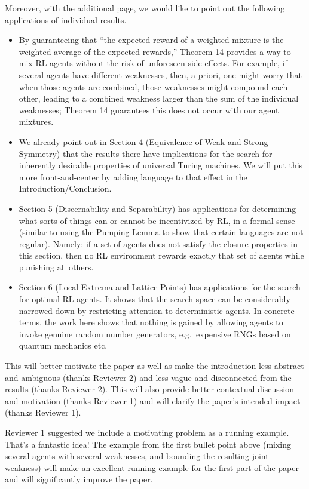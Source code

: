\documentclass{article}
\begin{document}
Moreover, with the additional page, we would like to point out the following applications of individual results.
\begin{itemize}
    \item
    By guaranteeing that ``the expected reward of a weighted mixture is the weighted
    average of the expected rewards,'' Theorem 14 provides a way to mix RL
    agents without the risk of unforeseen side-effects. For example, if several
    agents have different weaknesses,
    then, a priori, one might worry that when those agents are combined, those weaknesses
    might compound each other, leading to a combined weakness larger than the sum of the
    individual weaknesses; Theorem 14
    guarantees this does not occur with our agent mixtures.
    \item
    We already point out in Section 4 (Equivalence of Weak and Strong Symmetry)
    that the results there
    have implications for the search for inherently desirable properties of universal Turing
    machines. We will put this more front-and-center by adding language to that effect in the
    Introduction/Conclusion.
    \item
    Section 5 (Discernability and Separability) has applications for determining what
    sorts of things can or cannot be incentivized by RL, in a formal sense 
    (similar to using the Pumping Lemma to show that certain
    languages are not regular). Namely: if a set of agents does not satisfy the
    closure properties in this
    section, then no RL environment rewards
    exactly that set of agents while punishing all others.
    \item
    Section 6 (Local Extrema and Lattice Points) has applications for the search for
    optimal RL agents. It shows that the search space can be
    considerably narrowed down by restricting attention to deterministic agents. In concrete
    terms, the work here shows that nothing is gained by allowing agents to invoke
    genuine random number generators, e.g.\ expensive RNGs based on quantum mechanics etc.
\end{itemize}
This will better motivate the paper as well as make the introduction less abstract and ambiguous (thanks Reviewer 2) and less vague and disconnected from the results (thanks Reviewer 2). This will also provide better contextual discussion and motivation (thanks Reviewer 1) and will clarify the paper's intended impact (thanks Reviewer 1).

Reviewer 1 suggested we include a motivating problem as a running example. That's a fantastic idea! The example from the first bullet point above (mixing several agents with several weaknesses, and bounding the resulting joint weakness) will make an excellent running example for the first part of the paper and will significantly improve the paper.


\end{document}
